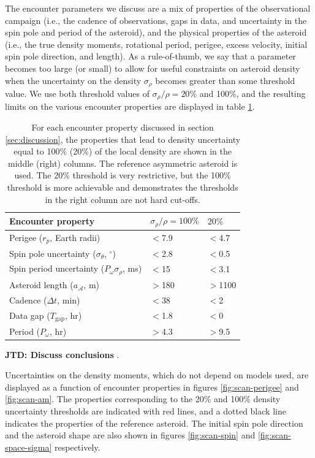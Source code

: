 \documentclass[fleqn,usenatbib]{mnras}
\newcommand{\jtd}[1]{ {\bf{\color{red} JTD: #1}} }
\begin{document}
The encounter parameters we discuss are a mix of properties of the observational campaign (i.e., the cadence of observations, gaps in data, and uncertainty in the spin pole and period of the asteroid), and the physical properties of the asteroid (i.e., the true density moments, rotational period, perigee, excess velocity, initial spin pole direction, and length). As a rule-of-thumb, we say that a parameter becomes too large (or small) to allow for useful constraints on asteroid density when the uncertainty on the density $\sigma_\rho$ becomes greater than some threshold value. We use both threshold values of $\sigma_\rho / \rho = 20\%$ and 100\%, and the resulting limits on the various encounter properties are displayed in table \ref{tab:threshold-summary}.

\begin{table}
  \centering
  \begin{tabular}{lll} \hline
    Encounter property & $\sigma_\rho / \rho = 100\%$ & $20\%$ \\ \hline
    Perigee ($r_p$, Earth radii) & $<$7.9 & $<$4.7 \\
    Spin pole uncertainty ($\sigma_\theta$, $^\circ$) & $<$2.8 & $<$0.5 \\
    Spin period uncertainty ($P_\omega \sigma_\rho$, ms) & $<$15 & $<$3.1\\
    Asteroid length ($a_\mathcal{A}$, m) & $>$180 & $>$1100 \\
    Cadence ($\Delta t$, min) & $<$38 & $<$2 \\
    Data gap ($T_\text{gap}$, hr) & $<$1.8 & $<$0 \\
    Period ($P_\omega$, hr) & $>$4.3 & $>$9.5\\ \hline
  \end{tabular}
  \caption{For each encounter property discussed in section \ref{sec:discussion}, the properties that lead to density uncertainty equal to 100\% (20\%) of the local density are shown in the middle (right) columns. The reference asymmetric asteroid is used. The 20\% threshold is very restrictive, but the 100\% threshold is more achievable and demonstrates the thresholds in the right column are not hard cut-offs.}
  \label{tab:threshold-summary}
\end{table}

\jtd{Discuss conclusions}.

Uncertainties on the density moments, which do not depend on models used, are displayed as a function of encounter properties in figures \ref{fig:scan-perigee} and \ref{fig:scan-am}. The properties corresponding to the 20\% and 100\% density uncertainty thresholds are indicated with red lines, and a dotted black line indicates the properties of the reference asteroid. The initial spin pole direction and the asteroid shape are also shown in figures \ref{fig:scan-spin} and \ref{fig:scan-space-sigma} respectively.
\end{document}
